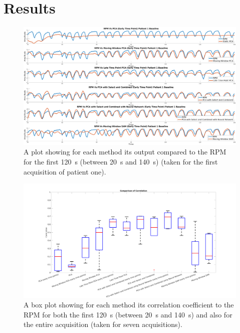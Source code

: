 \section{Results} \label{sec:results}
    \begin{figure}
        \centering
        
        \includegraphics[width=0.9\linewidth]{figures/patient_one_output.png}
        
        \captionsetup{singlelinecheck=false, justification=centering}
        \caption{A plot showing for each method its output compared to the \gls{RPM} for the first \SI{120}{\second} (between \SI{20}{\second} and \SI{140}{\second}) (taken for the first acquisition of patient one).}
        \label{fig:patient_one_output}
    \end{figure}
    
    \begin{figure}
        \centering
        
        \includegraphics[width=0.9\linewidth]{figures/box_plot.png}
        
        \captionsetup{singlelinecheck=false, justification=centering}
        \caption{A box plot showing for each method its correlation coefficient to the \gls{RPM} for both the first \SI{120}{\second} (between \SI{20}{\second} and \SI{140}{\second}) and also for the entire acquisition (taken for seven acquisitions).}
        \label{fig:box_plot}
    \end{figure}
    
